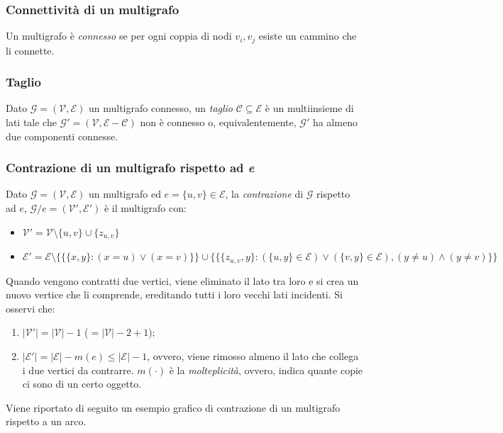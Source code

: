 \subsubsection*{Connettività di un multigrafo}
Un multigrafo è \textit{connesso} se per ogni coppia di nodi $v_i, v_j$ esiste un cammino che li connette.

\subsubsection*{Taglio}
Dato $\mathcal{G}=(\mathcal{V}, \mathcal{E})$ un multigrafo connesso, un \textit{taglio} $\mathcal{C} \subseteq \mathcal{E}$ è un multiinsieme di lati tale che $\mathcal{G}{}'=(\mathcal{V}, \mathcal{E}-\mathcal{C})$ non è connesso o, equivalentemente, $\mathcal{G}{}'$ ha almeno due componenti connesse.

\subsubsection*{Contrazione di un multigrafo rispetto ad \textit{e}}
\label{definizione_contrazione}
Dato $\mathcal{G}=(\mathcal{V}, \mathcal{E})$ un multigrafo ed $e=\{u,v\} \in \mathcal{E}$, la \textit{contrazione} di $\mathcal{G}$ rispetto ad $e$, $\mathcal{G}/e=(\mathcal{V}{}', \mathcal{E}{}')$ è il multigrafo con:
\begin{itemize}
    \item[] $\mathcal{V}{}'=\mathcal{V} \setminus \{u, v\} \cup \{z_{u,v}\}$
    \item[] $\mathcal{E}{}'=\mathcal{E} \setminus \{\{\{x, y\}: (x=u) \vee (x=v)\}\} \cup \{\{\{z_{u,v}, y\}: (\{u,y\} \in \mathcal{E}) \vee (\{v,y\} \in \mathcal{E}), (y\neq u) \wedge (y \neq v) \}\}$
\end{itemize}
Quando vengono contratti due vertici, viene eliminato il lato tra loro e 
si crea un nuovo vertice che li comprende, ereditando tutti i loro vecchi lati 
incidenti. Si osservi che:
\begin{enumerate}
    \item $|\mathcal{V}'| = |\mathcal{V}| - 1$ ($= |\mathcal{V}| - 2 + 1$);
    \item $|\mathcal{E}'| = |\mathcal{E}| - m(e) \le |\mathcal{E}| - 1$, ovvero, viene 
    rimosso almeno il lato che collega i due vertici da contrarre. $m(\cdot)$ è la 
    \textit{molteplicità}, ovvero, indica quante copie ci sono di un certo oggetto.
\end{enumerate}

Viene riportato di seguito un esempio grafico di contrazione di un multigrafo rispetto a un arco.

